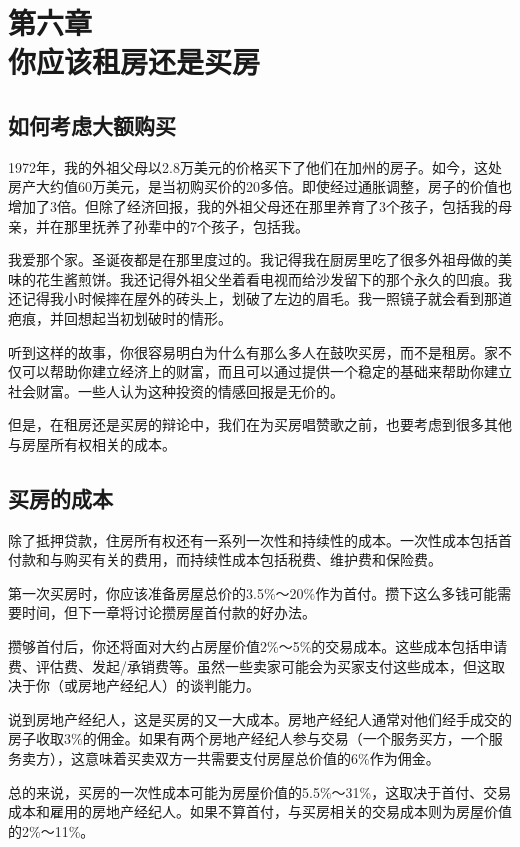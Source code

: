 \section[第六章\q 你应该租房还是买房]{第六章\\ 你应该租房还是买房}
\renewcommand{\bookchapter}{6}
\setcounter{figure}{0}
\setcounter{table}{0}
\subsection{如何考虑大额购买}
1972年，我的外祖父母以2.8万美元的价格买下了他们在加州的房子。如今，这处房产大约值60万美元，是当初购买价的20多倍。即使经过通胀调整，房子的价值也增加了3倍。但除了经济回报，我的外祖父母还在那里养育了3个孩子，包括我的母亲，并在那里抚养了孙辈中的7个孩子，包括我。

我爱那个家。圣诞夜都是在那里度过的。我记得我在厨房里吃了很多外祖母做的美味的花生酱煎饼。我还记得外祖父坐着看电视而给沙发留下的那个永久的凹痕。我还记得我小时候摔在屋外的砖头上，划破了左边的眉毛。我一照镜子就会看到那道疤痕，并回想起当初划破时的情形。

听到这样的故事，你很容易明白为什么有那么多人在鼓吹买房，而不是租房。家不仅可以帮助你建立经济上的财富，而且可以通过提供一个稳定的基础来帮助你建立社会财富。一些人认为这种投资的情感回报是无价的。

但是，在租房还是买房的辩论中，我们在为买房唱赞歌之前，也要考虑到很多其他与房屋所有权相关的成本。

\subsection{买房的成本}
除了抵押贷款，住房所有权还有一系列一次性和持续性的成本。一次性成本包括首付款和与购买有关的费用，而持续性成本包括税费、维护费和保险费。

第一次买房时，你应该准备房屋总价的3.5\%～20\%作为首付。攒下这么多钱可能需要时间，但下一章将讨论攒房屋首付款的好办法。

攒够首付后，你还将面对大约占房屋价值2\%～5\%的交易成本。这些成本包括申请费、评估费、发起/承销费等。虽然一些卖家可能会为买家支付这些成本，但这取决于你（或房地产经纪人）的谈判能力。

说到房地产经纪人，这是买房的又一大成本。房地产经纪人通常对他们经手成交的房子收取3\%的佣金。如果有两个房地产经纪人参与交易（一个服务买方，一个服务卖方），这意味着买卖双方一共需要支付房屋总价值的6\%作为佣金。

总的来说，买房的一次性成本可能为房屋价值的5.5\%～31\%，这取决于首付、交易成本和雇用的房地产经纪人。如果不算首付，与买房相关的交易成本则为房屋价值的2\%～11\%。

